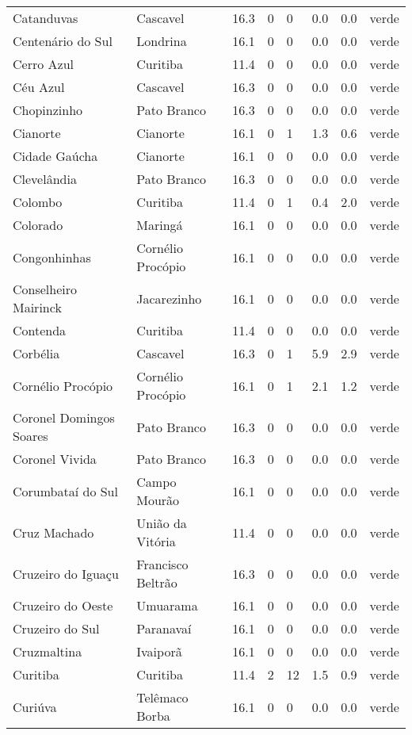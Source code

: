 \begin{longtable}{l|lllllll}
  Catanduvas & Cascavel & 16.3 & 0 & 0 & 0.0 & 0.0 & verde \\ 
  Centenário do Sul & Londrina & 16.1 & 0 & 0 & 0.0 & 0.0 & verde \\ 
  Cerro Azul & Curitiba & 11.4 & 0 & 0 & 0.0 & 0.0 & verde \\ 
  Céu Azul & Cascavel & 16.3 & 0 & 0 & 0.0 & 0.0 & verde \\ 
  Chopinzinho & Pato Branco & 16.3 & 0 & 0 & 0.0 & 0.0 & verde \\ 
  Cianorte & Cianorte & 16.1 & 0 & 1 & 1.3 & 0.6 & verde \\ 
  Cidade Gaúcha & Cianorte & 16.1 & 0 & 0 & 0.0 & 0.0 & verde \\ 
  Clevelândia & Pato Branco & 16.3 & 0 & 0 & 0.0 & 0.0 & verde \\ 
  Colombo & Curitiba & 11.4 & 0 & 1 & 0.4 & 2.0 & verde \\ 
  Colorado & Maringá & 16.1 & 0 & 0 & 0.0 & 0.0 & verde \\ 
  Congonhinhas & Cornélio Procópio & 16.1 & 0 & 0 & 0.0 & 0.0 & verde \\ 
  Conselheiro Mairinck & Jacarezinho & 16.1 & 0 & 0 & 0.0 & 0.0 & verde \\ 
  Contenda & Curitiba & 11.4 & 0 & 0 & 0.0 & 0.0 & verde \\ 
  Corbélia & Cascavel & 16.3 & 0 & 1 & 5.9 & 2.9 & verde \\ 
  Cornélio Procópio & Cornélio Procópio & 16.1 & 0 & 1 & 2.1 & 1.2 & verde \\ 
  Coronel Domingos Soares & Pato Branco & 16.3 & 0 & 0 & 0.0 & 0.0 & verde \\ 
  Coronel Vivida & Pato Branco & 16.3 & 0 & 0 & 0.0 & 0.0 & verde \\ 
  Corumbataí do Sul & Campo Mourão & 16.1 & 0 & 0 & 0.0 & 0.0 & verde \\ 
  Cruz Machado & União da Vitória & 11.4 & 0 & 0 & 0.0 & 0.0 & verde \\ 
  Cruzeiro do Iguaçu & Francisco Beltrão & 16.3 & 0 & 0 & 0.0 & 0.0 & verde \\ 
  Cruzeiro do Oeste & Umuarama & 16.1 & 0 & 0 & 0.0 & 0.0 & verde \\ 
  Cruzeiro do Sul & Paranavaí & 16.1 & 0 & 0 & 0.0 & 0.0 & verde \\ 
  Cruzmaltina & Ivaiporã & 16.1 & 0 & 0 & 0.0 & 0.0 & verde \\ 
  Curitiba & Curitiba & 11.4 & 2 & 12 & 1.5 & 0.9 & verde \\ 
  Curiúva & Telêmaco Borba & 16.1 & 0 & 0 & 0.0 & 0.0 & verde \\ 

\end{longtable}
